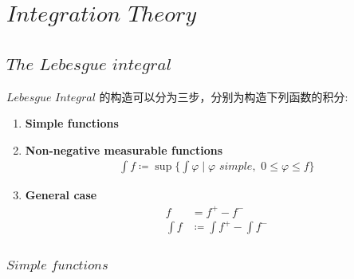 \ifx\allfiles\undefined


	\else
	\fi
\chapter{$Integration \,\, Theory$}
\section{$The \,\, Lebesgue \,\, integral$}
	$Lebesgue$ $Integral$ 的构造可以分为三步，分别为构造下列函数的积分:
	\begin{enumerate}
		\item \textbf{Simple functions} 
	
		\item \textbf{Non-negative measurable functions}
		\begin{align}
			\int f \coloneqq \sup{\{ \int \varphi \mid \varphi \,\, simple , \,\, 0 \leq \varphi \leq f \}}
		\end{align}
	
		\item \textbf{General case}
		\begin{align}
			f &= f^{+} - f^{-} \\
			\int f &\coloneqq \int f^{+} - \int f^{-}
		\end{align}
	\end{enumerate}

\subsection{$Simple \,\, functions$}
